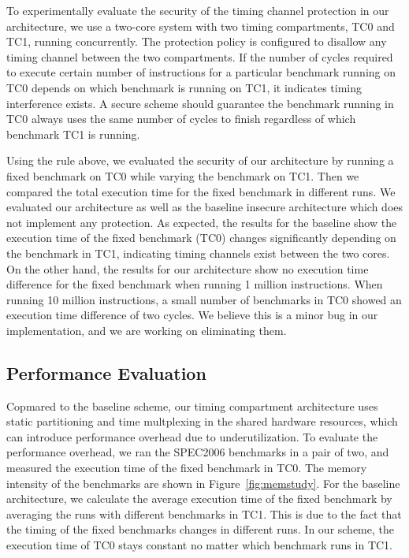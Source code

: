 To experimentally evaluate the security of the timing channel protection in our architecture,
we use a two-core system with two timing compartments, TC0 and TC1, running
concurrently. The protection policy is configured to disallow any timing channel between
the two compartments.
If the number of cycles required to execute certain number of instructions 
for a particular benchmark running on TC0 depends on which benchmark is running on 
TC1, it indicates timing interference exists.%
A secure scheme should guarantee the benchmark running in TC0 always uses the same number of cycles
to finish regardless of which benchmark TC1 is running. 

Using the rule above, we evaluated the security of our architecture by running a fixed benchmark
on TC0 while varying the benchmark on TC1. Then we compared the total execution time for the fixed
benchmark in different runs. We evaluated our architecture as well as the baseline insecure architecture 
which does not implement any protection. As expected, the results for
the baseline show the execution time of the fixed benchmark (TC0) changes significantly depending on 
the benchmark in TC1, indicating timing channels exist between the two cores. On the other hand,
the results for our architecture show no execution time difference for the fixed benchmark when
running 1 million instructions. 
When running 10 million instructions, a small number of benchmarks in TC0
showed an execution time difference of two cycles. We believe this is a minor bug in our
implementation, and we are working on eliminating them.

\subsection{Performance Evaluation}

Copmared to the baseline scheme, our timing compartment architecture uses static partitioning and time multplexing
in the shared hardware resources, which can introduce performance overhead due to
underutilization. To evaluate the performance overhead, we ran the SPEC2006 benchmarks in a pair of two, and
measured the execution time of the fixed benchmark in TC0. The memory intensity of the benchmarks are shown
in Figure~\ref{fig:memstudy}. For the baseline architecture, we calculate the average execution time of the fixed benchmark
by averaging the runs with different benchmarks in TC1. This is due to the fact that the timing of the fixed
benchmarks changes in different runs. 
In our scheme, the execution time of TC0 stays constant no matter which benchmark runs in TC1.

